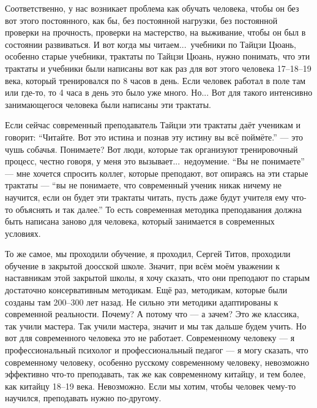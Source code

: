 Соответственно, у нас возникает проблема как 
обучать человека, чтобы он без вот этого постоянного, 
как бы, без постоянной нагрузки, без постоянной 
проверки на прочность, проверки на мастерство, на 
выживание, чтобы он был в состоянии развиваться.  И вот 
когда мы читаем...\ учебники по Тайцзи Цюань, особенно 
старые учебники, трактаты по Тайцзи Цюань, нужно 
понимать, что эти трактаты и учебники были написаны 
вот как раз для вот этого человека 17--18--19 века, который 
тренировался по 8 часов в день. Если человек 
работал в поле там или где-то, то 4 часа в день это было 
уже много.
Но... Вот для такого интенсивно 
занимающегося человека были написаны эти трактаты. 

Если сейчас современный преподаватель Тайцзи эти 
трактаты даёт ученикам и говорит: ``Читайте. Вот это 
истина и познав эту истину вы всё поймёте.'' --- это чушь 
собачья. Понимаете? Вот люди, которые так организуют 
тренировочный процесс, честно говоря, у меня это 
вызывает...\ недоумение. ``Вы не понимаете'' ---  мне хочется 
спросить коллег, которые преподают, вот опираясь на 
эти старые трактаты --- ``вы не понимаете, что современный 
ученик никак ничему не научится, если он будет эти 
трактаты читать, пусть даже будут учителя ему что-то 
объяснять и так далее.'' То есть современная методика 
преподавания должна быть написана заново для 
человека, который занимается в современных условиях. 

То же самое, мы проходили обучение, я проходил, Сергей 
Титов, проходили обучение в закрытой доосской школе. 
Значит, при всём моём уважении к наставникам этой 
закрытой школы, я хочу сказать, что они преподают по 
старым достаточно консервативным методикам. Ещё раз, 
методикам, которые были созданы там 200--300 лет назад. Не 
сильно эти методики адаптированы к современной 
реальности. Почему? А потому что --- а зачем?  Это же 
классика, так учили мастера.  Так учили мастера, 
значит и мы так дальше будем учить. Но вот для 
современного человека это не работает. Современному 
человеку --- я профессиональный психолог и 
профессиональный педагог --- я могу сказать, что 
современному человеку, особенно русскому 
современному человеку, невозможно эффективно что-то 
преподавать, так же как современному китайцу, и тем 
более, как китайцу 18--19 века. Невозможно. Если мы хотим, 
чтобы человек чему-то научился, преподавать нужно 
по-другому.

